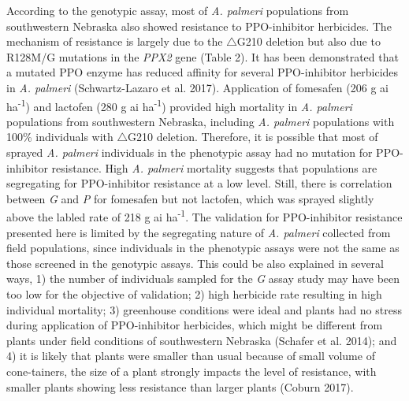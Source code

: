 \documentclass[
  12pt,
  a4paper]{article}
\begin{document}
According to the genotypic assay, most of \emph{A. palmeri} populations
from southwestern Nebraska also showed resistance to PPO-inhibitor
herbicides. The mechanism of resistance is largely due to the
\(\triangle\)G210 deletion but also due to R128M/G mutations in the
\emph{PPX2} gene (Table 2). It has been demonstrated that a mutated PPO
enzyme has reduced affinity for several PPO-inhibitor herbicides in
\emph{A. palmeri} (Schwartz-Lazaro et al. 2017). Application of
fomesafen (206 g ai ha\textsuperscript{-1}) and lactofen (280 g ai
ha\textsuperscript{-1}) provided high mortality in \emph{A. palmeri}
populations from southwestern Nebraska, including \emph{A. palmeri}
populations with 100\% individuals with \(\triangle\)G210 deletion.
Therefore, it is possible that most of sprayed \emph{A. palmeri}
individuals in the phenotypic assay had no mutation for PPO-inhibitor
resistance. High \emph{A. palmeri} mortality suggests that populations
are segregating for PPO-inhibitor resistance at a low level. Still,
there is correlation between \emph{G} and \emph{P} for fomesafen but not
lactofen, which was sprayed slightly above the labled rate of 218 g ai
ha\textsuperscript{-1}. The validation for PPO-inhibitor resistance
presented here is limited by the segregating nature of \emph{A. palmeri}
collected from field populations, since individuals in the phenotypic
assays were not the same as those screened in the genotypic assays. This
could be also explained in several ways, 1) the number of individuals
sampled for the \emph{G} assay study may have been too low for the
objective of validation; 2) high herbicide rate resulting in high
individual mortality; 3) greenhouse conditions were ideal and plants had
no stress during application of PPO-inhibitor herbicides, which might be
different from plants under field conditions of southwestern Nebraska
(Schafer et al. 2014); and 4) it is likely that plants were smaller than
usual because of small volume of cone-tainers, the size of a plant
strongly impacts the level of resistance, with smaller plants showing
less resistance than larger plants (Coburn 2017).
\end{document}
